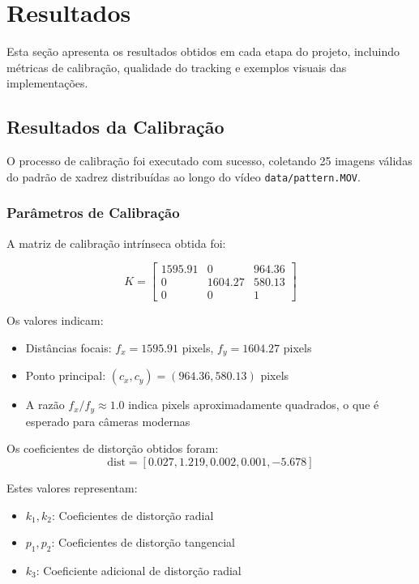 \section{Resultados}
\label{sec:resultados}

Esta seção apresenta os resultados obtidos em cada etapa do projeto, incluindo métricas de calibração, qualidade do tracking e exemplos visuais das implementações.

\subsection{Resultados da Calibração}

O processo de calibração foi executado com sucesso, coletando 25 imagens válidas do padrão de xadrez distribuídas ao longo do vídeo \texttt{data/pattern.MOV}.

\subsubsection{Parâmetros de Calibração}

A matriz de calibração intrínseca obtida foi:

\[
K = \begin{bmatrix}
1595.91 & 0 & 964.36 \\
0 & 1604.27 & 580.13 \\
0 & 0 & 1
\end{bmatrix}
\]

Os valores indicam:
\begin{itemize}
    \item Distâncias focais: $f_x = 1595.91$ pixels, $f_y = 1604.27$ pixels
    \item Ponto principal: $(c_x, c_y) = (964.36, 580.13)$ pixels
    \item A razão $f_x/f_y \approx 1.0$ indica pixels aproximadamente quadrados, o que é esperado para câmeras modernas
\end{itemize}

Os coeficientes de distorção obtidos foram:
\[
\text{dist} = [0.027, 1.219, 0.002, 0.001, -5.678]
\]

Estes valores representam:
\begin{itemize}
    \item $k_1, k_2$: Coeficientes de distorção radial
    \item $p_1, p_2$: Coeficientes de distorção tangencial
    \item $k_3$: Coeficiente adicional de distorção radial
\end{itemize}

